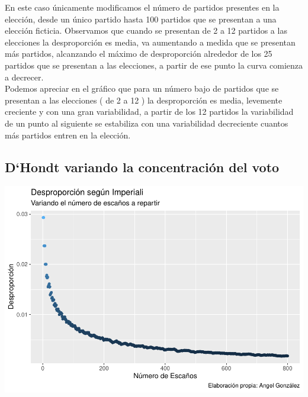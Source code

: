 \documentclass[12pt,a4paper,]{book}
\numberwithin{dummy}{section}
\theoremstyle{ocrenumbox}
\theoremstyle{blacknumex}
\theoremstyle{blacknumbox}
\theoremstyle{ocrenum}
\theoremstyle{ocrenum}
\begin{document}
En este caso únicamente modificamos el número de partidos presentes en
la elección, desde un único partido hasta 100 partidos que se presentan
a una elección ficticia. Observamos que cuando se presentan de 2 a 12
partidos a las elecciones la desproporción es media, va aumentando a
medida que se presentan más partidos, alcanzando el máximo de
desproporción alrededor de los 25 partidos que se presentan a las
elecciones, a partir de ese punto la curva comienza a decrecer.\\
Podemos apreciar en el gráfico que para un número bajo de partidos que
se presentan a las elecciones ( de 2 a 12 ) la desproporción es media,
levemente creciente y con una gran variabilidad, a partir de los 12
partidos la variabilidad de un punto al siguiente se estabiliza con una
variabilidad decreciente cuantos más partidos entren en la elección.

\hypertarget{dhondt-variando-la-concentraciuxf3n-del-voto}{%
\subsection{D`Hondt variando la concentración del
voto}\label{dhondt-variando-la-concentraciuxf3n-del-voto}}

\begin{center}\includegraphics[width=0.95\linewidth]{figurasR/unnamed-chunk-20-1} \end{center}
\end{document}
